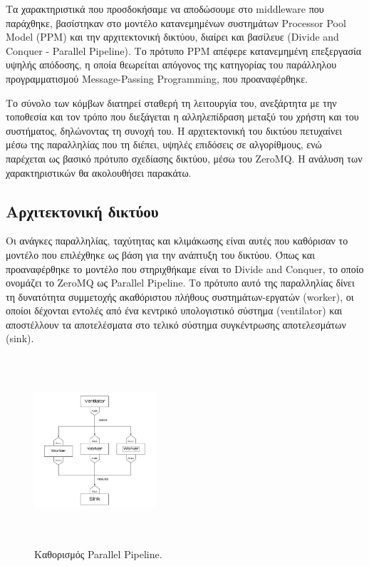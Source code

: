  Τα χαρακτηριστικά που προσδοκήσαμε να αποδώσουμε στο middleware που παράχθηκε, βασίστηκαν στο μοντέλο κατανεμημένων συστημάτων Processor \mbox{Pool} Model (PPM) και την αρχιτεκτονική δικτύου, διαίρει και βασίλευε (Divide and Conquer - Parallel Pipeline). Το πρότυπο PPM απέφερε κατανεμημένη επεξεργασία υψηλής απόδοσης, η οποία θεωρείται απόγονος της κατηγορίας του παράλληλου προγραμματισμού Message-Passing Programming, που προαναφέρθηκε. 

 Το σύνολο των κόμβων διατηρεί σταθερή τη λειτουργία του, ανεξάρτητα με την τοποθεσία και τον τρόπο που διεξάγεται η αλληλεπίδραση μεταξύ του χρήστη και του συστήματος, δηλώνοντας τη συνοχή του. Η αρχιτεκτονική του δικτύου πετυχαίνει μέσω της παραλληλίας που τη διέπει, υψηλές επιδόσεις σε αλγορίθμους, ενώ παρέχεται ως βασικό πρότυπο σχεδίασης δικτύου, μέσω του ZeroMQ. Η ανάλυση των χαρακτηριστικών θα ακολουθήσει παρακάτω. 
 
 \subsection{Αρχιτεκτονική δικτύου}
 
Οι ανάγκες παραλληλίας, ταχύτητας και κλιμάκωσης είναι αυτές που καθόρισαν το μοντέλο που επιλέχθηκε ως βάση για την ανάπτυξη του δικτύου. Όπως και προαναφέρθηκε το μοντέλο που στηριχθήκαμε είναι το Divide and Conquer, το οποίο ονομάζει το ZeroMQ ως Parallel Pipeline. Το πρότυπο αυτό της παραλληλίας δίνει τη δυνατότητα συμμετοχής ακαθόριστου πλήθους συστημάτων-εργατών (worker), οι οποίοι δέχονται εντολές από ένα κεντρικό υπολογιστικό σύστημα (ventilator) και αποστέλλουν τα αποτελέσματα στο τελικό σύστημα συγκέντρωσης αποτελεσμάτων (sink).  
  
\begin{figure}
    \centering
    \includegraphics[width=0.4\textwidth, height=7cm]{pictures/ParallelPipeline_new.png}
    \caption{Καθορισμός Parallel Pipeline. } %
\end{figure}  
  
